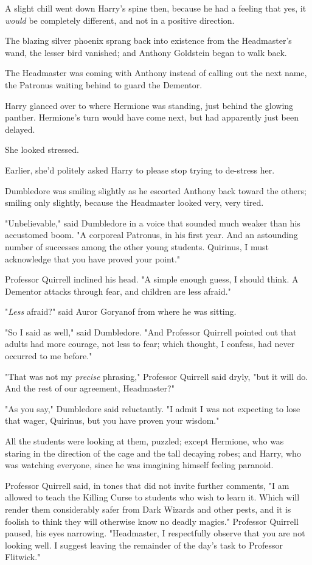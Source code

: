 A slight chill went down Harry's spine then, because he had a feeling that yes,
it \emph{would} be completely different, and not in a positive direction.

The blazing silver phoenix sprang back into existence from the Headmaster's
wand, the lesser bird vanished; and Anthony Goldstein began to walk back.

The Headmaster was coming with Anthony instead of calling out the next name,
the Patronus waiting behind to guard the Dementor.

Harry glanced over to where Hermione was standing, just behind the glowing
panther. Hermione's turn would have come next, but had apparently just been
delayed.

She looked stressed.

Earlier, she'd politely asked Harry to please stop trying to de-stress her.

Dumbledore was smiling slightly as he escorted Anthony back toward the others;
smiling only slightly, because the Headmaster looked very, very tired.

"Unbelievable," said Dumbledore in a voice that sounded much weaker than his
accustomed boom. "A corporeal Patronus, in his first year. And an astounding
number of successes among the other young students. Quirinus, I must
acknowledge that you have proved your point."

Professor Quirrell inclined his head. "A simple enough guess, I should think. A
Dementor attacks through fear, and children are less afraid."

"\emph{Less} afraid?" said Auror Goryanof from where he was sitting.

"So I said as well," said Dumbledore. "And Professor Quirrell pointed out that
adults had more courage, not less to fear; which thought, I confess, had never
occurred to me before."

"That was not my \emph{precise} phrasing," Professor Quirrell said dryly, "but
it will do. And the rest of our agreement, Headmaster?"

"As you say," Dumbledore said reluctantly. "I admit I was not expecting to lose
that wager, Quirinus, but you have proven your wisdom."

All the students were looking at them, puzzled; except Hermione, who was
staring in the direction of the cage and the tall decaying robes; and Harry,
who was watching everyone, since he was imagining himself feeling paranoid.

Professor Quirrell said, in tones that did not invite further comments, "I am
allowed to teach the Killing Curse to students who wish to learn it. Which will
render them considerably safer from Dark Wizards and other pests, and it is
foolish to think they will otherwise know no deadly magics." Professor Quirrell
paused, his eyes narrowing. "Headmaster, I respectfully observe that you are
not looking well. I suggest leaving the remainder of the day's task to
Professor Flitwick."

